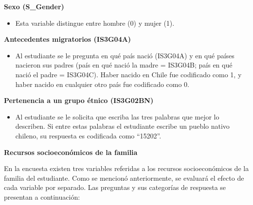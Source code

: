 \documentclass[12pt,twoside]{templates/facsothesis}
\providecommand{\tightlist}{%
  \setlength{\itemsep}{0pt}\setlength{\parskip}{0pt}}
\begin{document}
\textbf{Sexo (S\_Gender)}

\begin{itemize}
\tightlist
\item
  Esta variable distingue entre hombre (0) y mujer (1).
\end{itemize}

\textbf{Antecedentes migratorios (IS3G04A)}

\begin{itemize}
\tightlist
\item
  Al estudiante se le pregunta en qué país nació (IS3G04A) y en qué países nacieron sus padres (país en qué nació la madre = IS3G04B; país en qué nació el padre = IS3G04C). Haber nacido en Chile fue codificado como 1, y haber nacido en cualquier otro país fue codificado como 0.
\end{itemize}

\textbf{Pertenencia a un grupo étnico (IS3G02BN)}

\begin{itemize}
\tightlist
\item
  Al estudiante se le solicita que escriba las tres palabras que mejor lo describen. Si entre estas palabras el estudiante escribe un pueblo nativo chileno, su respuesta es codificada como ``15202''.
\end{itemize}

\textbf{Recursos socioeconómicos de la familia}

En la encuesta existen tres variables referidas a los recursos socioeconómicos de la familia del estudiante. Como se mencionó anteriormente, se evaluará el efecto de cada variable por separado. Las preguntas y sus categorías de respuesta se presentan a continuación:
\end{document}
